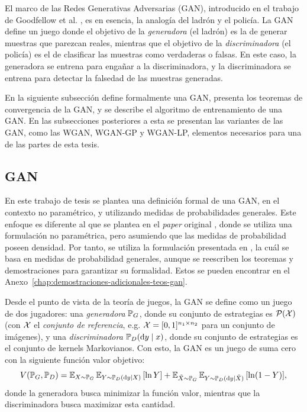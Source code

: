 El marco de las Redes Generativas Adversarias (GAN), introducido en el trabajo de Goodfellow et al. \cite{goodfellow2014generative}, es en esencia, la analogía del ladrón y el policía.
La GAN define un juego donde el objetivo de la \emph{generadora} (el ladrón) es la de generar muestras que parezcan reales, mientras que el objetivo de la \emph{discriminadora} (el policía) es el de clasificar las muestras como verdaderas o falsas.
En este caso, la generadora se entrena para engañar a la discriminadora, y la discriminadora se entrena para detectar la falsedad de las muestras generadas.

En la siguiente subsección define formalmente una GAN, presenta los teoremas de convergencia de la GAN, y se describe el algoritmo de entrenamiento de una GAN. En las subsecciones posteriores a esta se presentan las variantes de las GAN, como las WGAN, WGAN-GP y WGAN-LP, elementos necesarios para una de las partes de esta tesis.

\subsection{GAN}\label{ssec:GAN}

En este trabajo de tesis se plantea una definición formal de una GAN, en el contexto no paramétrico, y utilizando medidas de probabilidades generales. Este enfoque es diferente al que se plantea en el \textit{paper} original \cite{goodfellow2014generative}, donde se utiliza una formulación no paramétrica, pero asumiendo que las medidas de probabilidad poseen densidad. Por tanto, se utiliza la formulación presentada en \cite{wikipediagan}, la cuál se basa en medidas de probabilidad generales, aunque se reescriben los teoremas y demostraciones para garantizar su formalidad. Estos se pueden encontrar en el Anexo~\ref{chap:demostraciones-adicionales-teos-gan}.

Desde el punto de vista de la teoría de juegos, la GAN se define como un juego de dos jugadores: una \textit{generadora} $\Prob_G$, donde su conjunto de estrategias es $\ProbSpace[\cX]$ (con $\cX$ el \textit{conjunto de referencia}, e.g. $\cX=[0, 1]^{n_1\times n_2}$ para un conjunto de imágenes), y una \textit{discriminadora} $\Prob_D(\dd y \mid x)$, donde su conjunto de estrategias es el conjunto de kernels Markovianos. Con esto, la GAN es un juego de suma cero con la siguiente función valor objetivo:
\begin{equation}
    \label{eq:gan-objective}
    V(\Prob_G, \Prob_D)
    = \Exp_{X\sim\Prob_G}{\Exp_{Y \sim \Prob_D(\dd y \mid X)} \left[ \ln Y \right]}
    + \Exp_{\tilde X\sim\Prob_G}{\Exp_{Y \sim \Prob_D(\dd y \mid \tilde X)} \left[ \ln (1 - Y) \right]},
\end{equation}
donde la generadora busca minimizar la función valor, mientras que la discriminadora busca maximizar esta cantidad.

